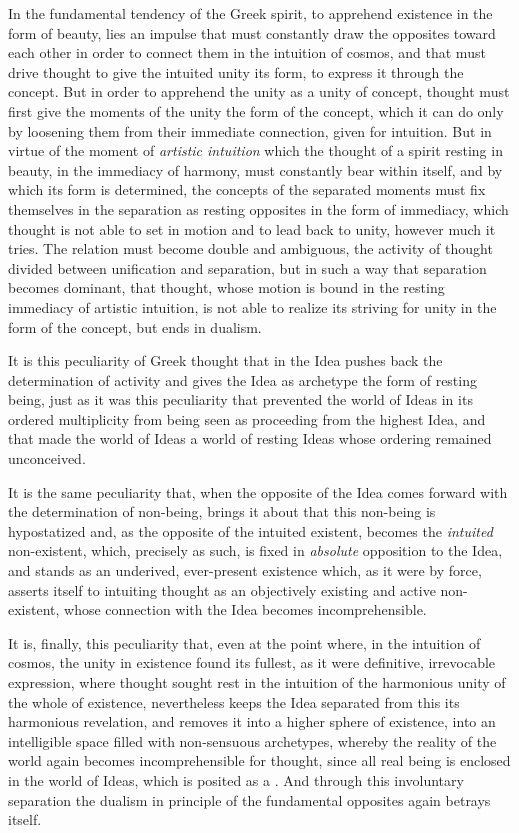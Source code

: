 In the fundamental tendency of the Greek spirit, to apprehend existence in the form of
beauty, lies an impulse that must constantly draw the opposites toward each other in order
to connect them in the intuition of cosmos, and that must drive thought to give the
intuited unity its form, to express it through the concept. But in order to apprehend the
unity as a unity of concept, thought must first give the moments of the unity the form of
the concept, which it can do only by loosening them from their immediate
connection, given for intuition. But in virtue of the moment of \emph{artistic intuition}
which the thought of a spirit resting in beauty, in the immediacy of harmony, must
constantly bear within itself, and by which its form is determined, the concepts of the
separated moments must fix themselves in the separation as resting opposites in the form of
immediacy, which thought is not able to set in motion and to lead back to unity, however
much it tries. The relation must become double and ambiguous, the activity of thought
divided between unification and separation, but in such a way that separation becomes
dominant, that thought, whose motion is bound in the resting immediacy of artistic
intuition, is not able to realize its striving for unity in the form of the concept, but
ends in dualism.

It is this peculiarity of Greek thought that in the Idea pushes back the determination of
activity and gives the Idea as archetype the form of resting being, just as it was this
peculiarity that prevented the world of Ideas in its ordered multiplicity from being seen
as proceeding from the highest Idea, and that made the world of Ideas a world of resting
Ideas whose ordering remained unconceived.

It is the same peculiarity that, when the opposite of the Idea comes forward with the
determination of non-being, brings it about that this non-being is hypostatized and, as the
opposite of the intuited existent, becomes the \emph{intuited} non-existent, which,
precisely as such, is fixed in \emph{absolute} opposition to the Idea, and stands as an
underived, ever-present existence which, as it were by force, asserts itself to intuiting
thought as an objectively existing and active non-existent, whose connection with the Idea
becomes incomprehensible.

It is, finally, this peculiarity that, even at the point where, in the intuition of cosmos,
the unity in existence found its fullest, as it were definitive, irrevocable expression,
where thought sought rest in the intuition of the harmonious unity of the whole
of existence, nevertheless keeps the Idea separated from this its harmonious revelation,
and removes it into a higher sphere of existence, into an intelligible space filled with
non-sensuous archetypes, whereby the reality of the world again becomes incomprehensible
for thought, since all real being is enclosed in the world of Ideas, which is posited as a
. And through this involuntary separation the dualism in principle of the
fundamental opposites again betrays itself.

